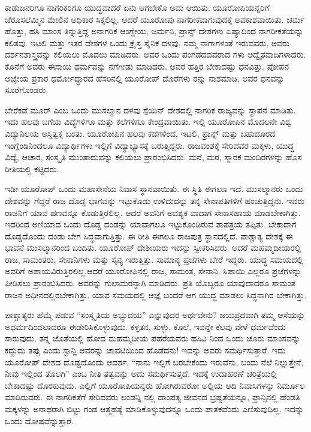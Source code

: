 ಕಾಡುಜನರಿಗೂ ನಾಗರಿಕರಿಗೂ ಯುದ್ಧವಾದರೆ ಏನು ಆಗಬೇಕೊ ಅದು ಆಯಿತು. ಯೂರೋಪಿಯನ್ನರಿಗೆ ಜೆರೂಸಲೆಮ್ಮಿನ ಮೇಲಿನ ಅಧಿಕಾರ ಸಿಕ್ಕಲಿಲ್ಲ. ಆದರೆ ಯೂರೋಪು ನಾಗರೀಕವಾಗುವುದಕ್ಕೆ ಅವಕಾಶವಾಯಿತು. ಚರ್ಮ ಹೊತ್ತು, ಹಸಿ ಮಾಂಸ ತಿನ್ನುತ್ತಿದ್ದ ಅನಾಗರಿಕ ಆಂಗ್ಲೇಯ, ಜರ್ಮನಿ, ಪ್ರಾನ್ಸ್​ ದೇಶಗಳು ಏಷ್ಯಾದಿಂದ ನಾಗರೀಕತೆಯನ್ನು ಕಲಿತವು. ಇಟಲಿ ಮತ್ತು ಇತರ ದೇಶಗಳ ಒಂದು ಕ್ರೈಸ್ತ ಸೈನಿಕ ದಳವು, ನಮ್ಮ ನಾಗಾಗಳಂತೆ ಇರುವವರು, ಅವರು ದರ್ಶನಶಾಸ್ತ್ರವನ್ನು ಕಲಿಯಲು ಮೊದಲು ಮಾಡಿದರು. ಅವರ ಒಂದು ಪಂಗಡದದವರಾದ ಗಳು ಅದ್ವೈತವಾದಿಗಳಾದರು. ಕೊನೆಗೆ ಅವರು ಈಸಾಯಿ ಧರ್ಮವನ್ನು ನಗೆಗೀಡು ಮಾಡಿದರು. ಅವರ ಹತ್ತಿರ ಬೇಕಾದಷ್ಟು ಧನವಿತ್ತು. ಪೋಪನ ಆಜ್ಞೇಯ ಪ್ರಕಾರ ಧರ್ಮೋದ್ಧಾರದ ಹೆಸರಿನಲ್ಲಿ ಯೂರೋಪ್​ ದೊರೆಗಳು  ರನ್ನು ನಾಶಮಾಡಿ, ಅವರ ಧನವನ್ನು ಸೂರೆಗೊಂಡರು.

ಬೇರೆಕಡೆ ಮೂರ್​ ಎಂಬ ಒಂದು ಮುಸಲ್ಮಾನ ದಳವು ಸ್ಪೆಯಿನ್​ ದೇಶದಲ್ಲಿ ನಾಗರಿಕ ರಾಜ್ಯವನ್ನು ಸ್ಥಾಪನೆ ಮಾಡಿತು. ಇದು ಹಲವು ಬಗೆಯ ವಿದ್ಯೆಗಳಿಗೂ ಮತ್ತು ಕಲೆಗಳಿಗೂ ಕೇಂದ್ರವಾಯಿತು. ಇಲ್ಲಿ ಯೂರೋಪಿನ ಮೊದಲನೇ ವಿಶ್ವ ವಿದ್ಯಾನಿಲಯ ಅಸ್ತಿತ್ವಕ್ಕೆ ಬಂತು. ಯೂರೋಪಿನ ಹಲವು ಕಡೆಗಳಿಂದ, ಇಟಲಿ, ಫ್ರಾನ್ಸ್​ ಮತ್ತು ಬಹುದೂರದ ಇಂಗ್ಲೆಂಡಿನಿಂದಲೂ ವಿದ್ಯಾರ್ಥಿಗಳು ಇಲ್ಲಿಗೆ ವಿದ್ಯಾಭ್ಯಾಸಕ್ಕೆ ಬರುತ್ತಿದ್ದರು. ರಾಜವಂಶಕ್ಕೆ ಸೇರಿದವರ ಮಕ್ಕಳು, ಯುದ್ಧ ವಿದ್ಯೆ, ಆಚಾರ, ಸಂಸ್ಕೃತಿ ಮುಂತಾದುವನ್ನು ಕಲಿಯಲು ಪ್ರಾರಂಭಿಸಿದರು. ಮನೆ, ಮಠ, ಸ್ಮಾರಕ ಮಂದಿರಗಳನ್ನು ಹೊಸ ರೀತಿಯಲ್ಲಿ ಕಟ್ಟಿದರು.

ಇಡೀ ಯೂರೋಪ್​ ಒಂದು ಮಹಾಸೇನೆಯ ನಿವಾಸ ಸ್ಥಾನವಾಯಿತು. ಈ ಸ್ಥಿತಿ ಈಗಲೂ ಇದೆ. ಮುಸಲ್ಮಾನರು ಒಂದು ದೇಶವನ್ನು ಗೆದ್ದರೆ ರಾಜ ದೊಡ್ಡ ಭಾಗವನ್ನು ಇಟ್ಟುಕೊಡು ಉಳಿದುದನ್ನು ತನ್ನ ಸೇನಾಪತಿಗಳಿಗೆ ಹಂಚುತ್ತಿದ್ದನು. ಇವರು ರಾಜನಿಗೆ ಯಾವ ಹಣವನ್ನೂ ಕೊಡುತ್ತಿರಲಿಲ್ಲ. ಆದರೆ ಅವನಿಗೆ ಅವಶ್ಯಕ ವಾದಾಗ ಸೇನಾಸಹಾಯ ಮಾಡಬೇಕಾಗಿತ್ತು. ಇದರಿಂದ ಅಣಿಯಾದ ಒಂದು ದೊಡ್ಡ ದಂಡನ್ನು ಯಾವಾಗಲೂ ಇಟ್ಟುಕೊಂಡಿರುವ ತಾಪತ್ರಯ ತಪ್ಪಿತು. ಬೇಕಾದಾಗ ದೊಡ್ಡದೊಂದು ದಂಡು ಬೇಗ ಸಿದ್ಧವಾಗುತ್ತಿತ್ತು. ಈ ರೀತಿ ಈಗಲೂ ರಾಜಪುತ್ರ ಸ್ಥಾನದಲ್ಲಿದೆ. ಪಾಶ್ಚಾತ್ಯ ದೇಶಕ್ಕೆ ಈ ಭಾವನೆ ಮುಸಲ್ಮಾನರಿಂದ ಬಂದಿತು. ಯೂರೋಪ್​ ದೇಶೀಯರು ಇದನ್ನು ಸ್ವೀಕರಿಸಿದರು. ಆದರೆ ಮಹಮ್ಮದೀಯರಲ್ಲಿ ರಾಜ, ಸಾಮಂತರು, ಸೇನಾನಿಗಳು ಮತ್ತು ಸೈನ್ಯ ಇರುತ್ತಿತ್ತು. ಸಾಮಾನ್ಯ ಪ್ರಜೆಗಳು ಬೇರೆ ಇದ್ದರು. ಯುದ್ಧ ಸಮಯದಲ್ಲಿ ಅವರಿಗೆ ಅಪಾಯವಿರುತ್ತಿರಲಿಲ್ಲ.ಆದರೆ ಯೂರೋಪಿನಲ್ಲಿ ರಾಜ, ಸಾಮಂತ, ಸೇನಾನಿ, ಸಿಪಾಯಿ ಎಲ್ಲರೂ ಪ್ರಜೆಗಳನ್ನು ಪೀಡಿಸಲು ಪ್ರಾರಂಭಿಸಿದರು. ಅವರನ್ನು ಗುಲಾಮರನ್ನಾಗಿ ಮಾಡಿದರು. ಪ್ರತಿ ಯೊಬ್ಬರೂ ಯಾವುದಾದರೂ ಸಾಮಂತ ರಾಜನ ಅಧೀನದಲ್ಲಿರಬೇಕಾಗಿತ್ತು. ಯಾವ ಸಮಯದಲ್ಲಿ ಆಜ್ಞೆ ಬಂದರೆ ಆಗ ಯುದ್ಧ ಮಾಡಲು ಸಿದ್ಧನಾಗಿರ ಬೇಕಾಗಿತ್ತು.

ಪಾಶ್ಚಾತ್ಯರು ಹೆಮ್ಮೆ ಪಡುವ “ಸಂಸ್ಕೃತಿಯ ಅಭ್ಯುದಯ” ಎನ್ನುವುದರ ಅರ್ಥವೇನು? ಜಯಪ್ರದವಾಗಿ ತಮ್ಮ ಆಸೆಯನ್ನು ಅಧರ್ಮದಿಂದಲಾದರೂ ಈಡೇರಿಸಿಕೊಳ್ಳುವುದು. ಕಳ್ಳತನ, ಸುಳ್ಳು, ಕೊಲೆ, ಇವನ್ನೇ ಕೆಲವು ವೇಳೆ ಧರ್ಮವೆಂದು ಸಾರುವುದು. ತನ್ನ ಜೊತೆಯಲ್ಲಿ ಹೋದ ಮಹಮ್ಮದೀಯ ಪಹರೆಯವರು ಹಸಿವಿ ನಿಂದ ಒಂದು ಚೂರು ಮಾಂಸವನ್ನು ಕದ್ದುದು ತಪ್ಪು ಎಂದು ಸ್ಟಾನ್ಲಿ ಅವರನ್ನು ಚಾವಟಿಯಿಂದ ಹೊಡೆದನು! ಇದನ್ನು ಅವರು ಸಮರ್ಥಿಸುತ್ತಾರೆ. ಇದು ಯೂರೋಪ್​ ದೇಶದ ದೊಡ್ಡದೊಂದು ಆದರ್ಶ. “ನಾನು ಇಲ್ಲಿಗೆ ಬರಬೇಕೆಂದು ಇರುವೆನು, ಬಂದು ನೆಲೆ ನಿಲ್ಲುತ್ತೇನೆ, ನೀವು ಇಲ್ಲಿಂದ ತೊಲಗಿ” ಎಂಬ ನೀತಿ ತತ್ವವನ್ನು ಅದು ಸಮರ್ಥಿಸುತ್ತದೆ. ಇದಕ್ಕೆ ಉದಾಹರಣೆ ಚರಿತ್ರೆಯಲ್ಲಿ ಬೇಕಾದಷ್ಟು ದೊರಕುವುದು. ಎಲ್ಲಿಗೆ ಯೂರೋಪಿಯನ್ನರು ಹೋಗಿರುವರೋ ಅಲ್ಲಿಯ ಆದಿ ನಿವಾಸಿಗಳನ್ನು ನಿರ್ಮೂಲ ಮಾಡಿರುವರು. ಈ ನಾಗರಿಕತೆಗೆ ಸೇರಿದವರು ಲಂಡನ್ನಿ ನಲ್ಲಿ ದಾಂಪತ್ಯ ಜೀವನದ ಭ್ರಷ್ಟತೆಯನ್ನೂ, ಫ್ರಾನ್ಸಿನಲ್ಲಿ ಹೆಂಡತಿ ಮಕ್ಕಳನ್ನು ಅನಾಥರಾಗಿ ಬಿಟ್ಟು ಗಂಡ ಆತ್ಮಹತ್ಯೆ ಮಾಡಿಕೊಳ್ಳುವುದನ್ನೂ ಒಂದು ಪಾತಕವೆಂದು ಎಣಿಸುವುದಿಲ್ಲ. ಇದನ್ನು ಒಂದು ದೋಷವೆನ್ನುತ್ತಾರೆ.


